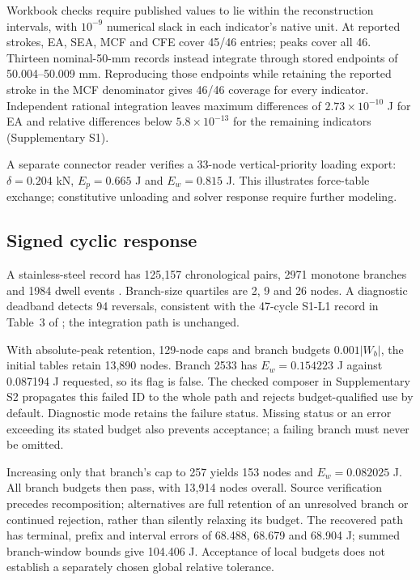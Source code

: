 \documentclass[preprint,12pt,a4paper]{elsarticle}
\begin{document}
Workbook checks require published values to lie within the reconstruction intervals, with $10^{-9}$ numerical slack in each indicator's native unit. At reported strokes, EA, SEA, MCF and CFE cover 45/46 entries; peaks cover all 46. Thirteen nominal-50-mm records instead integrate through stored endpoints of 50.004--50.009 mm. Reproducing those endpoints while retaining the reported stroke in the MCF denominator gives 46/46 coverage for every indicator. Independent rational integration leaves maximum differences of $2.73\times10^{-10}$ J for EA and relative differences below $5.8\times10^{-13}$ for the remaining indicators (Supplementary S1).

A separate connector reader verifies a 33-node vertical-priority loading export: $\delta=0.204$ kN, $E_p=0.665$ J and $E_w=0.815$ J. This illustrates force-table exchange; constitutive unloading and solver response require further modeling.

\subsection{Signed cyclic response}\label{sec:cyclic}
A stainless-steel record has 125,157 chronological pairs, 2971 monotone branches and 1984 dwell events \cite{CyclicDataset2024,CyclicPaper2022}. Branch-size quartiles are 2, 9 and 26 nodes. A diagnostic deadband detects 94 reversals, consistent with the 47-cycle S1-L1 record in Table~3 of \cite{CyclicPaper2022}; the integration path is unchanged.

With absolute-peak retention, 129-node caps and branch budgets $0.001|W_b|$, the initial tables retain 13,890 nodes. Branch 2533 has $E_w=0.154223$ J against 0.087194 J requested, so its  flag is false. The checked composer in Supplementary S2 propagates this failed ID to the whole path and rejects budget-qualified use by default. Diagnostic mode retains the failure status. Missing status or an error exceeding its stated budget also prevents acceptance; a failing branch must never be omitted.

Increasing only that branch's cap to 257 yields 153 nodes and $E_w=0.082025$ J. All branch budgets then pass, with 13,914 nodes overall. Source verification precedes recomposition; alternatives are full retention of an unresolved branch or continued rejection, rather than silently relaxing its budget. The recovered path has terminal, prefix and interval errors of 68.488, 68.679 and 68.904 J; summed branch-window bounds give 104.406 J. Acceptance of local budgets does not establish a separately chosen global relative tolerance.
\end{document}
